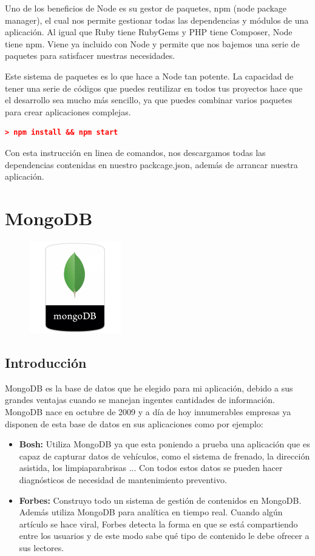 Uno de los beneficios de Node es su gestor de paquetes, npm (node package manager), el cual nos permite gestionar todas las dependencias y módulos de una aplicación. Al igual que Ruby tiene RubyGems y PHP tiene Composer, Node tiene npm.
Viene ya incluido con Node y permite que nos bajemos una serie de paquetes para satisfacer nuestras necesidades. 

Este sistema de paquetes es lo que hace a Node tan potente. La capacidad de tener una serie de códigos que puedes reutilizar en todos tus proyectos hace que el desarrollo sea mucho más sencillo, ya que puedes combinar varios paquetes para crear aplicaciones complejas.

\begin{lstlisting}[language=JSON] 
    > npm install && npm start
\end{lstlisting}

Con esta instrucción en linea de comandos, nos descargamos todas las dependencias contenidas en nuestro packcage.json, además de arrancar nuestra aplicación.


\section{MongoDB}
\begin{figure}[H]
    \centering
    \includegraphics[width=40mm]{memoria/LaTeX/img/infraestructura/mongo2.png}
\end{figure}
\subsection{Introducción}

MongoDB es la base de datos que he elegido para mi aplicación, debido a sus grandes ventajas cuando se manejan ingentes cantidades de información. MongoDB nace en octubre de 2009 y a día de hoy innumerables empresas ya disponen de esta base de datos en sus aplicaciones como por ejemplo:
\begin{itemize}
\item \textbf{Bosh:} Utiliza MongoDB ya que esta poniendo a prueba una aplicación que es capaz de capturar datos de vehículos, como el sistema de frenado, la dirección asistida, los limpiaparabrisas ... Con todos estos datos se pueden hacer diagnósticos de necesidad de mantenimiento preventivo.


\item \textbf{Forbes:} Construyo todo un sistema de gestión de contenidos en MongoDB. Además utiliza MongoDB para analítica en tiempo real. Cuando algún artículo se hace viral, Forbes detecta la forma en que se está compartiendo entre los usuarios y de este modo sabe qué tipo de contenido le debe ofrecer a sus lectores.
\end{itemize}

